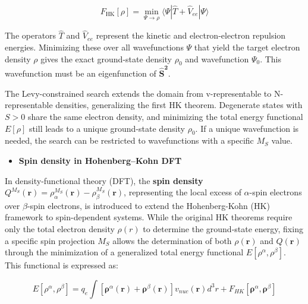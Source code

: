 \documentclass[%
 preprint, linenumbers,
 amsmath,amssymb,
 aps, physrev,
]{revtex4-2}
\begin{document}
\begin{equation}
    F_{\text{HK}}[\rho] = \min_{\Psi \to \rho} \langle \Psi | \hat{T} + \hat{V}_{ee} | \Psi \rangle
\end{equation}



The operators \( \hat{T} \) and \( \hat{V}_{ee} \) represent the kinetic and electron-electron repulsion energies. Minimizing these over all wavefunctions \( \Psi \) that yield the target electron density \( \rho \) gives the exact ground-state density \( \rho_0 \) and wavefunction \( \Psi_0 \). This wavefunction must be an eigenfunction of \(\mathbf{ \hat{S}^2 }\).

The Levy-constrained search extends the domain from v-representable to N-representable densities, generalizing the first HK theorem. Degenerate states with \( S > 0 \) share the same electron density, and minimizing the total energy functional \( E[\rho] \) still leads to a unique ground-state density \( \rho_0 \). If a unique wavefunction is needed, the search can be restricted to wavefunctions with a specific \( M_S \) value.




\begin{itemize}
    \item \textbf{ Spin density in Hohenberg–Kohn DFT}
\end{itemize}




In density-functional theory (DFT), the \textbf{spin density} \( Q^{M_S}(\mathbf{r}) = \rho_\alpha^{M_S}(\mathbf{r}) - \rho_\beta^{M_S}(\mathbf{r}) \), representing the local excess of \( \alpha \)-spin electrons over \( \beta \)-spin electrons, is introduced to extend the Hohenberg-Kohn (HK) framework to spin-dependent systems. While the original HK theorems require only the total electron density \( \rho(r) \) to determine the ground-state energy, fixing a specific spin projection \( M_S \) allows the determination of both \( \rho(\mathbf{r}) \) and \( Q(\mathbf{r}) \) through the minimization of a generalized total energy functional \( E[\rho^\alpha, \rho^{\beta}] \). This functional is expressed as:

\begin{equation}
   E[\rho^\alpha, \rho^{\beta}] = q_e \int [\mathbf{\rho}^{\alpha}(\mathbf{r}) +\mathbf{\rho}^{\beta}(\mathbf{r})] v_{nuc}(\mathbf{r}) d^3r + F_{HK}[\mathbf{\rho}^{\alpha}, \mathbf{\rho}^{\beta}]
\end{equation}
\end{document}

